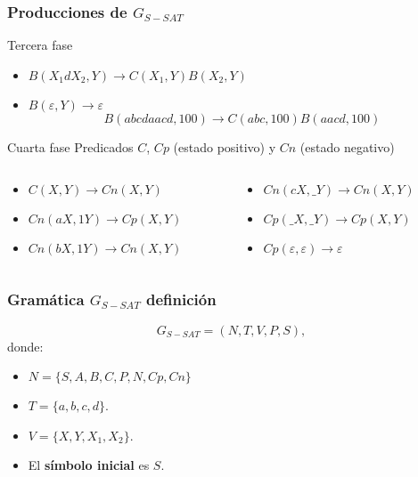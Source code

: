 \documentclass{beamer}
\begin{document}
\begin{frame}
    \frametitle{Producciones de $G_{S-SAT}$}

    \begin{block}{Tercera fase}
        \begin{itemize}
            \item $B(X_1dX_2,Y)\to C(X_1,Y) B(X_2,Y)$
                  \pause
            \item $B(\varepsilon,Y)\to\varepsilon$
                  \pause
                  $$B(abcdaacd,100)\to C(abc,100) B(aacd,100)$$
        \end{itemize}

    \end{block}
    \pause
    \begin{block}{Cuarta fase}
        Predicados $C$, $Cp$ (estado positivo) y $Cn$ (estado negativo)\\
        \begin{columns}
            \begin{column}{0.45\textwidth}
                \begin{itemize}
                    \item $C(X,Y)\to Cn(X,Y)$
                          \pause
                    \item $Cn(aX,1Y)\to Cp(X,Y)$
                          \pause
                    \item $Cn(bX,1Y)\to Cn(X,Y)$
                \end{itemize}
            \end{column}
            \pause
            \begin{column}{0.45\textwidth}
                \begin{itemize}
                    \item $Cn(cX,\_Y)\to Cn(X,Y)$
                          \pause
                    \item $Cp(\_X,\_Y)\to Cp(X,Y)$
                          \pause
                    \item $Cp(\varepsilon,\varepsilon)\to \varepsilon$
                \end{itemize}
            \end{column}
        \end{columns}

    \end{block}
\end{frame}


\begin{frame}
    \frametitle{Gramática $G_{S-SAT}$ definición}

    \[
        G_{S-SAT} = (N, T, V, P, S),
    \]
    donde:

    \begin{itemize}
        \item $N=\{S,A,B,C,P,N,Cp,Cn\}$
        \item $T=\{a,b,c,d\}$.
        \item $V=\{X,Y,X_1,X_2\}$.
        \item El \textbf{símbolo inicial} es $S$.
    \end{itemize}
\end{frame}
\end{document}
